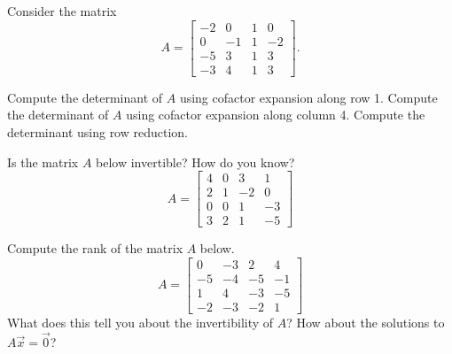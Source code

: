 \begin{exercise}\ansMark%
Consider the matrix
\begin{equation*}
A = \begin{bmatrix}
-2 & 0 & 1 & 0 \\ 0 & -1 & 1 & -2 \\ -5 &3 & 1 & 3 \\ -3 & 4 & 1 & 3
\end{bmatrix}.
\end{equation*}
\begin{tasks}
\task Compute the determinant of $A$ using cofactor expansion along row 1.
\task Compute the determinant of $A$ using cofactor expansion along column 4.
\task Compute the determinant using row reduction.
\end{tasks}
\end{exercise}
%



\begin{exercise}
Is the matrix $A$ below invertible? How do you know?
\[ A = \begin{bmatrix}4&0&3&1 \\ 2 &1&-2&0 \\ 0&0&1&-3 \\3 & 2 & 1 & -5 \end{bmatrix} \]
\end{exercise}

\begin{exercise}\ansMark%
Compute the rank of the matrix $A$ below.
\[ A =  \begin{bmatrix} 0 & -3 & 2 & 4 \\ -5 & -4 &-5 & -1 \\ 1&4&-3 & -5\\ -2 & -3 &-2&1\end{bmatrix} \]
What does this tell you about the invertibility of $A$? How about the solutions to $A\vec{x} = \vec{0}$? 
\end{exercise}

